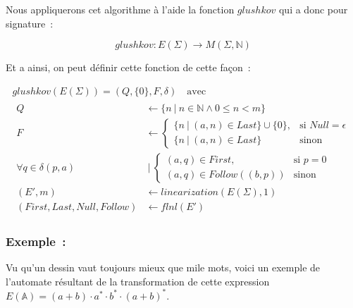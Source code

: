 \documentclass[12pt]{article}
\begin{document}
Nous appliquerons cet algorithme à l'aide la fonction \(glushkov\) qui a donc
pour signature~:

\[
    glushkov: E(\Sigma) \to M(\Sigma, \mathbb{N})
\]

Et a ainsi, on peut définir cette fonction de cette façon~:

\begin{gather}
    glushkov     (E(\Sigma)) = (Q, \{0\}, F, \delta) \quad \text{avec} \\
    \begin{align*}
        Q                                             & \leftarrow \{n ~|~ n \in \mathbb{N} \land 0 \leq n < m\}                                                                                            \\
        F                                             & \leftarrow \begin{cases} \{n ~|~ (a, n) \in Last\} \cup \{0\}, & \text{si } Null = \epsilon \\ \{n ~|~ (a, n) \in Last\} & \text{sinon} \end{cases} \\
        \forall q                    \in \delta(p, a) & ~|~ \begin{cases} (a, q) \in First, & \text{si } p = 0 \\ (a, q) \in Follow((b, p)) & \text{sinon} \end{cases}                                      \\
        (E', m)                                       & \leftarrow linearization(E(\Sigma), 1)                                                                                                              \\
        (First, Last, Null, Follow)                   & \leftarrow flnl(E')
    \end{align*}
\end{gather}

\subsubsection*{Exemple~:}

Vu qu'un dessin vaut toujours mieux que mile mots, voici un exemple de
l'automate résultant de la transformation de cette expression \(E(\mathbb{A}) =
(a+b) \cdot a^* \cdot b^* \cdot (a+b)^*\).
\end{document}
